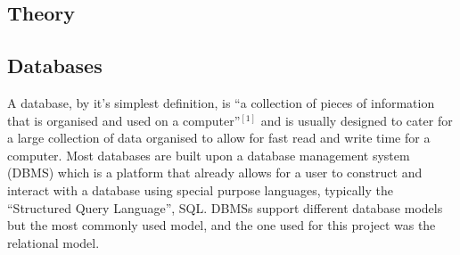 \documentclass[11pt, a4paper]{article}
\begin{document}
\begin{multicols}{2}
\section{Theory} 
\subsection{Databases}
A database, by it's simplest definition, is ``a collection of pieces of information that is organised and used on a computer''$^{[1]}$ and is usually designed to cater for a large collection of data organised to allow for fast read and write time for a computer. Most databases are built upon a database management system (DBMS) which is a platform that already allows for a user to construct and interact with a database using special purpose languages, typically the ``Structured Query Language'', SQL. DBMSs support different database models but the most commonly used model, and the one used for this project was the relational model.

\end{multicols}
\end{document}
